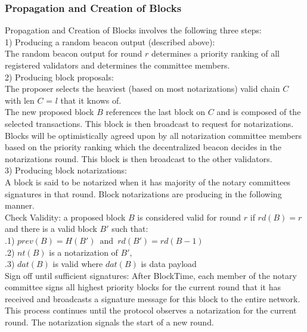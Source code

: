 \documentclass[10pt,journal,compsoc]{IEEEtran}
\begin{document}
\subsubsection{Propagation and Creation of Blocks}
Propagation and Creation of Blocks involves the following three steps: 
\\
1) Producing a random beacon output (described above):
\\ The random beacon output for round $r$ determines a priority ranking of all registered validators and determines the committee members.
\\
2) Producing block proposals:
    \\
    The proposer selects the heaviest (based on most \indent notarizations) valid chain $C$ with len $C$ = $l$ that it knows \indent of.
    \\
     The new proposed block $B$ references the last block \indent on $C$ and is composed of the selected transactions. This \indent block is then broadcast to request for notarizations.
\\
Blocks will be optimistically agreed upon by all notarization committee members based on the priority ranking which the decentralized beacon decides in the notarizations round. This block is then broadcast to the other validators.
\\
3) Producing block notarizations:
\\
A block is said to be notarized when it has majority of the notary committees signatures in that round. Block notarizations are producing in the following manner. 
\\  Check Validity: a proposed block $B$ is considered \indent valid for round $r$ if 
$rd(B) = r$ and there is a valid block \indent $B'$ such that:\\
\indent {}.1) $prev(B)=H(B') \, \textrm{ and } \, rd(B') = rd(B-1)$ \\ 
\indent {}.2) $nt(B)$ is a notarization of $B'$, \\
\indent{}.3) $dat(B)$ is valid where $dat(B)$ is data payload \\
 Sign off until sufficient signatures: After BlockTime, \indent each member of the notary committee signs all highest \indent priority blocks for the current round that it has received \indent and broadcasts a signature message for this block to \indent the entire network. This process continues until the \indent protocol observes a notarization for the current round. \indent The notarization signals the start of a new round. \\
\indent \indent 
\end{document}
